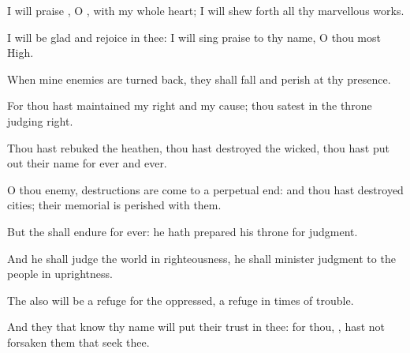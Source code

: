 {\Q {}I will
praise
{}, O
{}, with my whole
heart; I will shew
forth all thy marvellous
works.


\par }{\Q {}I will be
glad and
rejoice in thee: I will sing
praise to thy
name, O thou most
High.


\par }{\Q {}When mine
enemies are
turned
back, they shall
fall and
perish at thy
presence.


\par }{\Q {}For thou hast
maintained my
right and my
cause; thou
satest in the
throne
judging
right.


\par }{\Q {}Thou hast
rebuked the
heathen, thou hast
destroyed the
wicked, thou hast put
out their
name for
ever and
ever.


\par }{\Q {}O thou
enemy,
destructions are come to a
perpetual
end: and thou hast
destroyed
cities; their
memorial is
perished with
them.


\par }{\Q {}But the
{} shall
endure for
ever: he hath
prepared his
throne for
judgment.


\par }{\Q {}And he shall
judge the
world in
righteousness, he shall minister
judgment to the
people in
uprightness.


\par }{\Q {}The
{} also will be a
refuge for the
oppressed, a
refuge in
times of
trouble.


\par }{\Q {}And they that
know thy
name will put their
trust in thee: for thou,
{}, hast not
forsaken them that
seek thee.


\par }{\BB \par }
